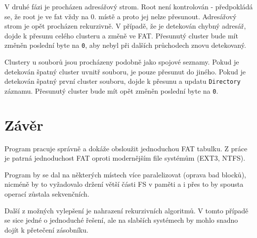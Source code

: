 \documentclass[11pt,a4paper]{scrartcl}
\begin{document}
	V druhé fázi je procházen adresářový strom. Root není kontrolován - předpokládá se, že root je ve fat vždy na 0. místě a proto jej nelze přesunout. Adresářový strom je opět procházen rekurzivně. V případě, že je detekován chybný adresář, dojde k přesunu celého clusteru a změně ve FAT. Přesunutý cluster bude mít změněn poslední byte na \verb|0|, aby nebyl při dalších průchodech znovu detekovaný.
	
	Clustery u souborů jsou procházeny podobně jako spojové seznamy. Pokud je detekován špatný cluster uvnitř souboru, je pouze přesunut do jiného. Pokud je detekován špatný první cluster souboru, dojde k přesunu a updatu \verb|Directory| záznamu. Přesunutý cluster bude mít opět změněn poslední byte na \verb|0|.
	
	\section{Závěr}
	Program pracuje správně a dokáže obsloužit jednoduchou FAT tabulku. Z práce je patrná jednoduchost FAT oproti modernějším file systémům (EXT3, NTFS).
	
	Program by se dal na některých místech více paralelizovat (oprava bad blocků), nicméně by to vyžadovalo držení větší části FS v paměti a i přes to by spousta operací zůstala sekvenčních.
	
	Další z možných vylepšení je nahrazení rekurzivních algoritmů. V tomto případě se sice jedné o jednoduché řešení, ale na slabších systémech by mohlo snadno dojít k přetečení zásobníku.	
	
	
	
	
	
\end{document}
